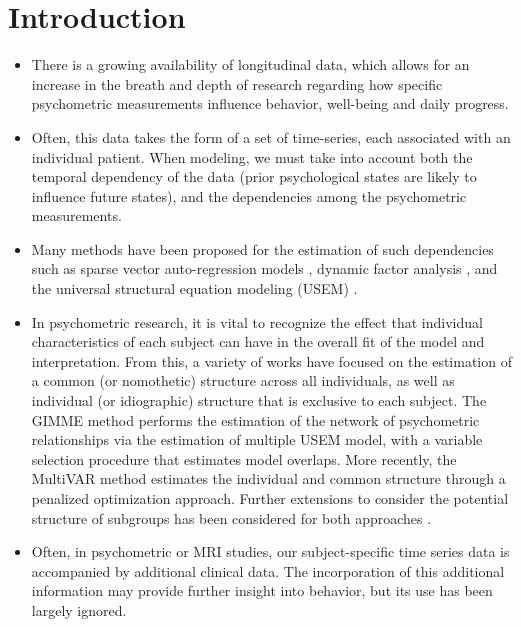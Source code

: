 

\section{Introduction}


\begin{itemize}
	\item There is a growing availability of longitudinal data, which allows for an increase in the breath and depth of research regarding how specific psychometric measurements influence behavior, well-being and daily progress.
	
	\item Often, this data takes the form of a set of time-series, each associated with an individual patient. When modeling, we must take into account both the temporal dependency of the data (prior psychological states are likely to influence future states), and the dependencies among the psychometric measurements.
	
	\item Many methods have been proposed for the estimation of such dependencies such as sparse vector auto-regression models \citep{basu2015regularized}, dynamic factor analysis \citep{stock2002forecasting}, and the universal structural equation modeling (USEM) \citep{kim2007unified}.
	
	\item In psychometric research, it is vital to recognize the effect that individual characteristics of each subject can have in the overall fit of the model and interpretation. From this, a variety of works have focused on the estimation of a common (or nomothetic) structure across all individuals, as well as individual (or idiographic) structure that is exclusive to each subject. The GIMME method \citep{gates2012group} performs the estimation of the network of psychometric relationships via the estimation of multiple USEM model, with a variable selection procedure that estimates model overlaps. More recently, the MultiVAR method \citep{fisher2022penalized} estimates the individual and common structure through a penalized optimization approach. Further extensions to consider the potential structure of subgroups has been considered for both approaches \citep{lane2019uncovering,crawford2024penalized}.
	
	
	\item Often, in psychometric or MRI studies, our subject-specific time series data is accompanied by additional clinical data. The incorporation of this additional information may provide further insight into behavior, but its use has been largely ignored.
	

\end{itemize}
